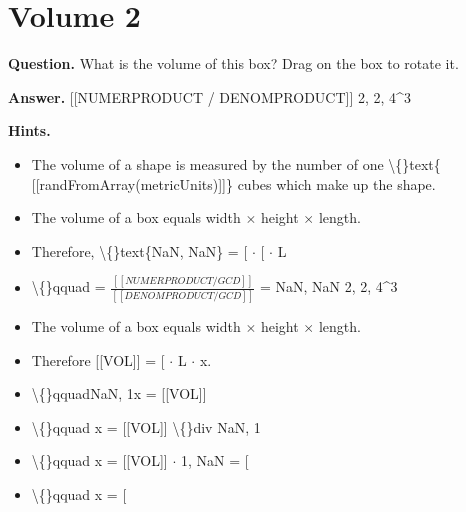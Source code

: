 \documentclass{article}
\begin{document}
\section*{Volume 2}
\textbf{Question.} What is the volume of this box? Drag on the box to rotate it.

\textbf{Answer.} [[NUMERPRODUCT / DENOMPRODUCT]] 2, 2, 4\textasciicircum{}3

\textbf{Hints.}
\begin{itemize}
  \item The volume of a shape is measured by the number of one \textbackslash\{\}text\{ [[randFromArray(metricUnits)]]\} cubes which make up the shape.
  \item The volume of a box equals width $\times$ height $\times$ length.
  \item Therefore, \textbackslash\{\}text\{NaN, NaN\} = [ $\cdot$ [ $\cdot$ L
  \item \textbackslash\{\}qquad = 
                    $\frac{[[NUMERPRODUCT / GCD]]}{[[DENOMPRODUCT / GCD]]}$ = 
                    NaN, NaN 2, 2, 4\textasciicircum{}3
  \item The volume of a box equals width $\times$ height $\times$ length.
  \item Therefore [[VOL]] = [ $\cdot$ L $\cdot$ x.
  \item \textbackslash\{\}qquadNaN, 1x = [[VOL]]
  \item \textbackslash\{\}qquad x = [[VOL]] \textbackslash\{\}div
                    NaN, 1
  \item \textbackslash\{\}qquad x = [[VOL]] $\cdot$
                    1, NaN
                    = [
  \item \textbackslash\{\}qquad x = [
\end{itemize}
\end{document}
